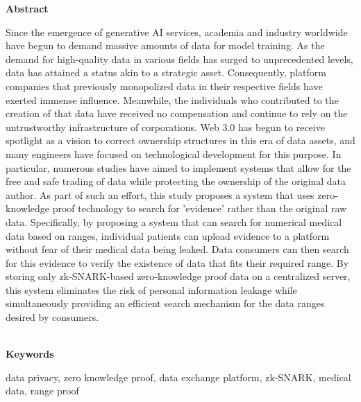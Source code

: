 
\clearpage

{\noindent \bfseries Abstract \par}
\vspace{1cm}
Since the emergence of generative AI services, academia and industry worldwide have begun to demand massive amounts of data for model training. As the demand for high-quality data in various fields has surged to unprecedented levels, data has attained a status akin to a strategic asset. Consequently, platform companies that previously monopolized data in their respective fields have exerted immense influence. Meanwhile, the individuals who contributed to the creation of that data have received no compensation and continue to rely on the untrustworthy infrastructure of corporations. Web 3.0 has begun to receive spotlight as a vision to correct ownership structures in this era of data assets, and many engineers have focused on technological development for this purpose. In particular, numerous studies have aimed to implement systems that allow for the free and safe trading of data while protecting the ownership of the original data author. As part of such an effort, this study proposes a system that uses zero-knowledge proof technology to search for 'evidence' rather than the original raw data. Specifically, by proposing a system that can search for numerical medical data based on ranges, individual patients can upload evidence to a platform without fear of their medical data being leaked. Data consumers can then search for this evidence to verify the existence of data that fits their required range. By storing only zk-SNARK-based zero-knowledge proof data on a centralized server, this system eliminates the risk of personal information leakage while simultaneously providing an efficient search mechanism for the data ranges desired by consumers. \\ \\

{\noindent \bfseries Keywords \par}
\noindent data privacy, zero knowledge proof, data exchange platform, zk-SNARK, medical data, range proof
